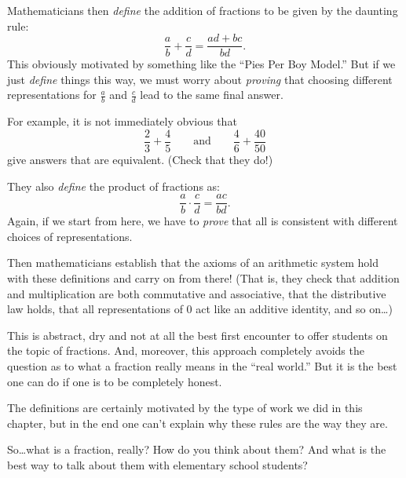 Mathematicians then \emph{define} the addition of fractions to be given by the daunting rule:
\[
\frac a b + \frac c d = 
\frac{ad +bc}{bd}.
\]
This obviously motivated by something like the ``Pies Per Boy Model.''   But if we just \emph{define} things this way, we must worry
about \emph{proving} that choosing different representations for $\frac a b$ and $\frac c d$
lead to the same
final answer. 

For example, it is not immediately obvious that
\[
\frac 2 3 + \frac 4 5
\qquad
\text{and}
\qquad 
\frac 4 6 + \frac{40}{50}
\]
give
answers that are equivalent.  (Check that they do!)

They also \emph{define} the product of fractions as:
\[
\frac a b \cdot \frac cd = \frac{ac}{bd}.
\]
Again, if we start from here, we have to \emph{prove} that all is
consistent with different choices of representations.

Then mathematicians establish that the axioms of an arithmetic system hold with these
definitions and carry on from there!  (That is, they check that addition and multiplication are both commutative and associative, that the distributive law holds, that all representations of 0 act like an additive identity, and so on\dots)

This is abstract, dry and not at all the best first encounter to offer students on the topic of
fractions. And, moreover, this approach completely avoids the question as to what a
fraction really means in the ``real world.'' But it is the best one can do if one is to be
completely honest. 

The definitions are certainly motivated by the type of work we did in this chapter, but in the end one can't explain why these rules are the way they are.

\begin{thinkpair*}
So\dots what is a fraction, really?  How do you think about them?  And what is the best way to talk about them with elementary school students?
\end{thinkpair*}



  
